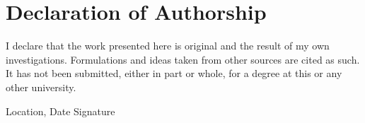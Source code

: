 \chapter{Declaration of Authorship}
\thispagestyle{empty}

\noindent%
I declare that the work presented here is original and the result of my own investigations. Formulations and ideas taken from other sources are cited as such. It has not been submitted, either in part or whole, for a degree at this or any other university.

\vfill

Location, Date \hfill Signature\\

